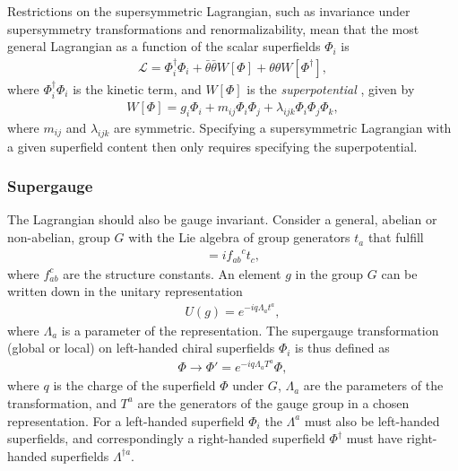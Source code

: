 \documentclass[twoside,english]{uiofysmaster}
\begin{document}
Restrictions on the supersymmetric Lagrangian, such as invariance under supersymmetry transformations and renormalizability, mean that the most general Lagrangian as a function of the scalar superfields $\Phi_i$ is
\begin{align}
\mathcal{L} = \Phi_i^{\dagger} \Phi_i + \bar{\theta} \bar{\theta} W[\Phi] + \theta \theta W[\Phi^{\dagger}],
\end{align}
where $\Phi_i^{\dagger} \Phi_i$ is the kinetic term, and $W[\Phi]$ is the \textit{superpotential} , given by
\begin{align}\label{Eq:: superpotential}
W[\Phi] = g_i \Phi_i + m_{ij} \Phi_i \Phi_j + \lambda_{ijk} \Phi_i \Phi_j \Phi_k,
\end{align}
where $m_{ij}$ and $\lambda_{ijk}$ are symmetric. Specifying a supersymmetric Lagrangian with a given superfield content then only requires specifying the superpotential. 

\subsubsection{Supergauge}\label{Sec:: phys back : Supergauge}



The Lagrangian should also be gauge invariant. Consider a general, abelian or non-abelian, group $G$ with the Lie algebra of group generators $t_a$ that fulfill
\begin{align}
[t_a, t_b] = i {f_{ab}}^ct_c,
\end{align}
where ${f_{ab}^c}$ are the structure constants. An element $g$ in the group $G$ can be written down in the unitary representation
\begin{align}
U(g) = e^{-i q\Lambda_at^a}, 
\end{align}
where $\Lambda_a$ is a parameter of the representation. The supergauge transformation (global or local) on left-handed chiral superfields $\Phi_i$ is thus defined as \cite{batzing2017lecture} 
\begin{align}
\Phi \rightarrow \Phi' = e^{-i q\Lambda_a T^a } \Phi,
\end{align} 
where $q$ is the charge of the superfield $\Phi$ under $G$, $\Lambda_a$ are the parameters of the transformation, and $T^a$ are the generators of the gauge group in a chosen representation. For a left-handed superfield $\Phi_i$ the $\Lambda^a$ must also be left-handed superfields, and correspondingly a right-handed superfield $\Phi^{\dagger}$ must have right-handed superfields $\Lambda^{\dagger a}$. 
\end{document}

